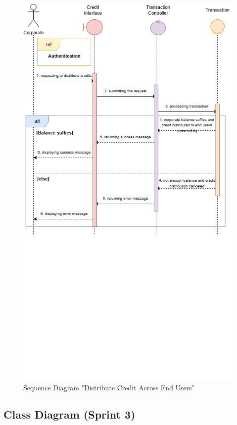 \begin{figure}[H] 
  \centering
  \includegraphics[width=\textwidth,keepaspectratio]{images/seq_distribute_credit_across_end_users.png}
  \caption{Sequence Diagram "Distribute Credit Across End Users"}
  \label{fig:seq_distribute_credit}
\end{figure}

\subsection{Class Diagram (Sprint 3)}

